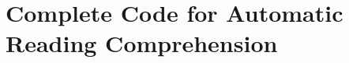 \chapter{Complete Code for Automatic Reading Comprehension} %

\label{AppendixC} %

\lstset{language=Python}
\lstset{frame=lines}
\lstset{basicstyle=\footnotesize}



